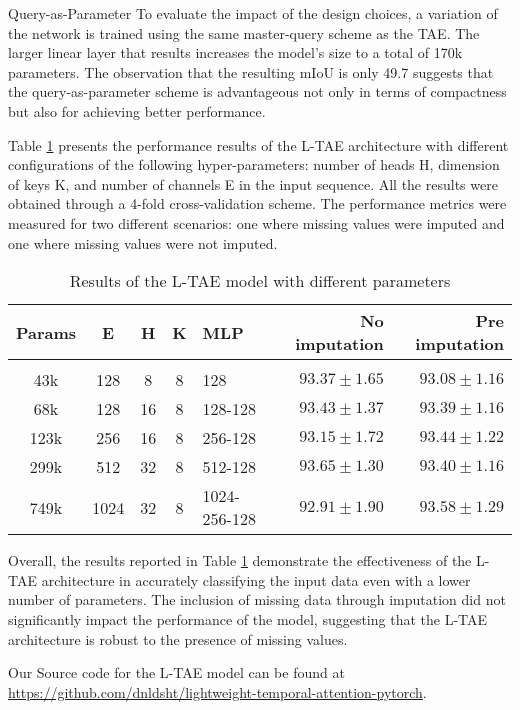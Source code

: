 \begin{paragraph} {Query-as-Parameter}
To evaluate the impact of the design choices, a variation of the network is trained using the same master-query scheme as the TAE.
The larger linear layer that results increases the model's size to a total of 170k parameters.
The observation that the resulting mIoU is only 49.7 suggests that the query-as-parameter scheme is advantageous not only in terms of compactness but also for achieving better performance.
\end{paragraph}

Table \ref{tab:LTAEresults} presents the performance results of the L-TAE architecture with different configurations of the following hyper-parameters: number of heads H, dimension of keys K, and number of channels E in the input sequence.
All the results were obtained through a 4-fold cross-validation scheme.
The performance metrics were measured for two different scenarios: one where missing values were imputed and one where missing values were not imputed.

\begin{table}[H]
  \centering
  \begin{tabular}{cccclrr} 
     Params & E & H & K & MLP & No imputation & Pre imputation\\[0.2cm] 
     \hline \\[-0.2cm] 
     43k & 	128 & 	8 & 	8 & 	128 & 	$93.37 \pm 1.65$ & 	$93.08 \pm 1.16$\\ 
     68k & 	128 & 	16 & 	8 & 	128-128 & 	$93.43 \pm 1.37$ & 	$93.39 \pm 1.16$\\ 
     123k & 	256 & 	16 & 	8 & 	256-128 & 	$93.15 \pm 1.72$ & 	$93.44 \pm 1.22$\\ 
     299k & 	512 & 	32 & 	8 & 	512-128 & 	$\mathbf{93.65 \pm 1.30}$ & 	$93.40 \pm 1.16$\\ 
     749k & 	1024 & 	32 & 	8 & 	1024-256-128 & 	$92.91 \pm 1.90$ & 	$\mathbf{93.58 \pm 1.29}$\\ 
  \end{tabular}
  \caption{Results of the L-TAE model with different parameters}
  \label{tab:LTAEresults}
\end{table}

Overall, the results reported in Table \ref{tab:LTAEresults} demonstrate the effectiveness of the L-TAE architecture in accurately classifying the input data even with a lower number of parameters. 
The inclusion of missing data through imputation did not significantly impact the performance of the model, suggesting that the L-TAE architecture is robust to the presence of missing values.


Our Source code for the L-TAE model can be found at \url{https://github.com/dnldsht/lightweight-temporal-attention-pytorch}.